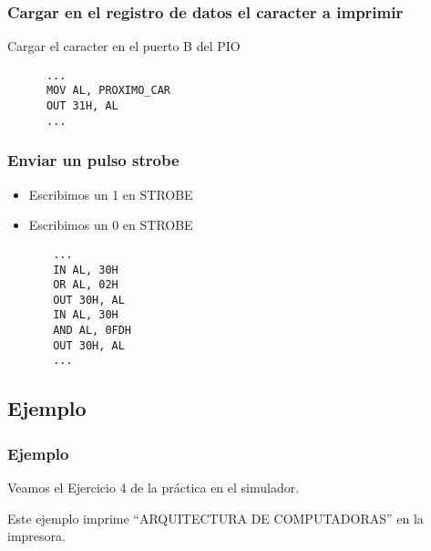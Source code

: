 \documentclass{beamer}
\begin{document}
\begin{frame}[fragile]
\frametitle{Cargar en el registro de datos el caracter a imprimir}
Cargar el caracter en el puerto B del PIO
\begin{block}{}
\begin{verbatim}
      ...
      MOV AL, PROXIMO_CAR
      OUT 31H, AL
      ...
\end{verbatim}
\end{block}
\end{frame}

\begin{frame}[fragile]
\frametitle{Enviar un pulso strobe}
\begin{itemize}
    \item Escribimos un 1 en STROBE
    \item Escribimos un 0 en STROBE
\end{itemize}
\begin{block}{}
\begin{verbatim}
       ...
       IN AL, 30H
       OR AL, 02H
       OUT 30H, AL
       IN AL, 30H
       AND AL, 0FDH
       OUT 30H, AL           
       ...
\end{verbatim}
\end{block}

\end{frame}

\subsection{Ejemplo}
\begin{frame}
\frametitle{Ejemplo}
Veamos el Ejercicio 4 de la práctica en el simulador.

Este ejemplo imprime ``ARQUITECTURA DE COMPUTADORAS'' en la impresora.
\end{frame}
\end{document}
